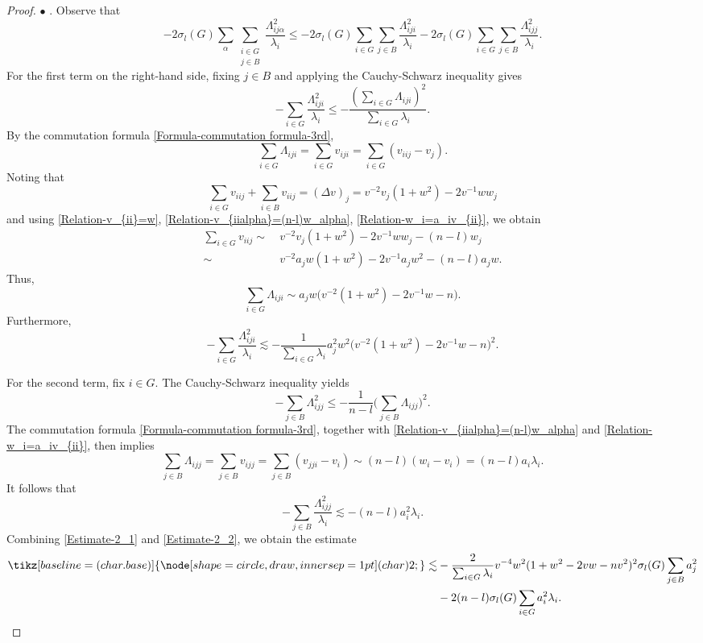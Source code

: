\documentclass[11pt]{amsart}
\newcommand{\circled}[1]{
  \tikz[baseline=(char.base)]{
    \node[shape=circle,draw,inner sep=1pt] (char) {#1};
  }
}
\numberwithin{theorem}{section}
\numberwithin{equation}{section}
\begin{document}
\begin{proof}
$\bullet$ \circled{2}. Observe that $$-2\sigma_l(G)\sum_\alpha\sum_{\substack{i\in G\\ j\in B}}\frac{\Lambda_{ij\alpha}^2}{\lambda_i}\leq-2\sigma_l(G)\sum_{i\in G}\sum_{j\in B}\frac{\Lambda_{iji}^2}{\lambda_i}-2\sigma_l(G)\sum_{i\in G}\sum_{j\in B}\frac{\Lambda_{ijj}^2}{\lambda_i}.$$ For the first term on the right-hand side, fixing $j\in B$ and applying the Cauchy-Schwarz inequality gives $$-\sum_{i\in G}\frac{\Lambda_{iji}^2}{\lambda_i}\leq-\frac{(\sum_{i\in G}\Lambda_{iji})^2}{\sum_{i\in G}\lambda_i}.$$ By the commutation formula \eqref{Formula-commutation formula-3rd}, $$\sum_{i\in G}\Lambda_{iji}=\sum_{i\in G}v_{iji}=\sum_{i\in G}(v_{iij}-v_j).$$ Noting that $$\sum_{i\in G}v_{iij}+\sum_{i\in B}v_{iij}=(\Delta v)_j=v^{-2}v_j(1+w^2)-2v^{-1}ww_j$$ and using \eqref{Relation-v_{ii}=w}, \eqref{Relation-v_{iialpha}=(n-l)w_alpha}, \eqref{Relation-w_i=a_iv_{ii}}, we obtain
\begin{align*}
\sum_{i\in G}v_{iij}
\sim&~v^{-2}v_j(1+w^2)-2v^{-1}ww_j-(n-l)w_j\\
\sim&~v^{-2}a_jw(1+w^2)-2v^{-1}a_jw^2-(n-l)a_jw.
\end{align*}
Thus, $$\sum_{i\in G}\Lambda_{iji}\sim a_jw\big(v^{-2}(1+w^2)-2v^{-1}w-n\big).$$ Furthermore,
\begin{equation}\label{Estimate-2_1}
-\sum_{i\in G}\frac{\Lambda_{iji}^2}{\lambda_i}\lesssim-\frac{1}{\sum_{i\in G}\lambda_i}a_j^2w^2\big(v^{-2}(1+w^2)-2v^{-1}w-n\big)^2.
\end{equation}

For the second term, fix $i\in G$. The Cauchy-Schwarz inequality yields $$-\sum_{j\in B}\Lambda_{ijj}^2\leq-\frac{1}{n-l}\big(\sum_{j\in B}\Lambda_{ijj}\big)^2.$$ The commutation formula \eqref{Formula-commutation formula-3rd}, together with \eqref{Relation-v_{iialpha}=(n-l)w_alpha} and \eqref{Relation-w_i=a_iv_{ii}}, then implies $$\sum_{j\in B}\Lambda_{ijj}=\sum_{j\in B}v_{ijj}=\sum_{j\in B}(v_{jji}-v_i)\sim(n-l)(w_i-v_i)=(n-l)a_i\lambda_i.$$ It follows that
\begin{equation}\label{Estimate-2_2}
-\sum_{j\in B}\frac{\Lambda_{ijj}^2}{\lambda_i}\lesssim-(n-l)a_i^2\lambda_i.
\end{equation}
Combining \eqref{Estimate-2_1} and \eqref{Estimate-2_2}, we obtain the estimate
\begin{equation}\label{Estimate-2}
\begin{aligned}
\circled{2}
\lesssim&-\frac{2}{\sum_{i\in G}\lambda_i}v^{-4}w^2(1+w^2-2vw-nv^2)^2\sigma_l(G)\sum_{j\in B}a_j^2\\
&-2(n-l)\sigma_l(G)\sum_{i\in G}a_i^2\lambda_i.
\end{aligned}
\end{equation}


\end{proof}
\end{document}
